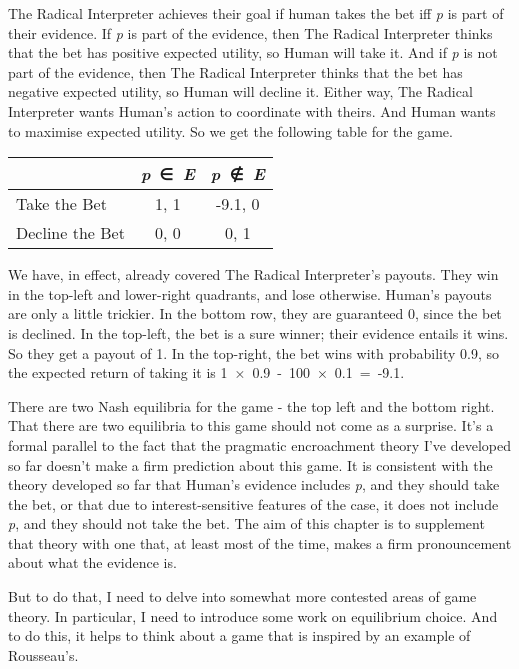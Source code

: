 \documentclass[
  11pt,
]{book}
\begin{document}
The Radical Interpreter achieves their goal if human takes the bet iff \emph{p} is part of their evidence. If \emph{p} is part of the evidence, then The Radical Interpreter thinks that the bet has positive expected utility, so Human will take it. And if \emph{p} is not part of the evidence, then The Radical Interpreter thinks that the bet has negative expected utility, so Human will decline it. Either way, The Radical Interpreter wants Human's action to coordinate with theirs. And Human wants to maximise expected utility. So we get the following table for the game.

\begin{longtable}[]{@{}lcc@{}}
\toprule\noalign{}
& \emph{p}~∈~\emph{E} & \emph{p}~∉~\emph{E} \\
\midrule\noalign{}
\endhead
\bottomrule\noalign{}
\endlastfoot
Take the Bet & 1, 1 & -9.1, 0 \\
Decline the Bet & 0, 0 & 0, 1 \\
\end{longtable}

We have, in effect, already covered The Radical Interpreter's payouts. They win in the top-left and lower-right quadrants, and lose otherwise. Human's payouts are only a little trickier. In the bottom row, they are guaranteed 0, since the bet is declined. In the top-left, the bet is a sure winner; their evidence entails it wins. So they get a payout of 1. In the top-right, the bet wins with probability 0.9, so the expected return of taking it is 1~×~0.9~-~100~×~0.1~=~‑9.1.

There are two Nash equilibria for the game - the top left and the bottom right. That there are two equilibria to this game should not come as a surprise. It's a formal parallel to the fact that the pragmatic encroachment theory I've developed so far doesn't make a firm prediction about this game. It is consistent with the theory developed so far that Human's evidence includes \emph{p}, and they should take the bet, or that due to interest-sensitive features of the case, it does not include \emph{p}, and they should not take the bet. The aim of this chapter is to supplement that theory with one that, at least most of the time, makes a firm pronouncement about what the evidence is.

But to do that, I need to delve into somewhat more contested areas of game theory. In particular, I need to introduce some work on equilibrium choice. And to do this, it helps to think about a game that is inspired by an example of Rousseau's.
\end{document}
